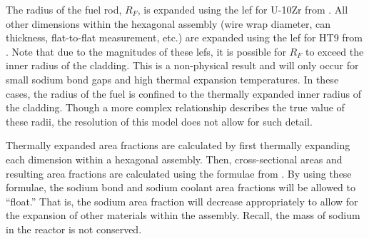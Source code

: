     The radius of the fuel rod, $R_F$, is expanded using the \gls{lef} for
    U-10Zr from . All other dimensions within the hexagonal
    assembly (wire wrap diameter, can thickness, flat-to-flat measurement, etc.)
    are expanded using the \gls{lef} for HT9 from . Note that
    due to the magnitudes of these \glspl{lef}, it is possible for $R_F$ to
    exceed the inner radius of the cladding. This is a non-physical result and
    will only occur for small sodium bond gaps and high thermal expansion
    temperatures. In these cases, the radius of the fuel is confined to the
    thermally expanded inner radius of the cladding. Though a more complex
    relationship describes the true value of these radii, the resolution of this
    model does not allow for such detail.
    
    Thermally expanded area fractions are calculated by first thermally 
    expanding each dimension within a hexagonal assembly. Then, cross-sectional
    areas and resulting area fractions are calculated using the formulae from
    . By using these formulae, the sodium bond
    and sodium coolant area fractions will be allowed to ``float.'' That is, the
    sodium area fraction will decrease appropriately to allow for the expansion
    of other materials within the assembly. Recall, the mass of sodium in the
    reactor is not conserved.
  
